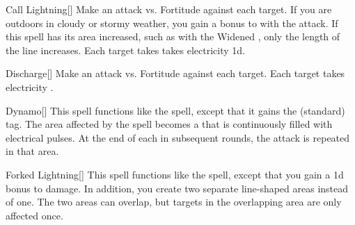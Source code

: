 \lowercase{\hypertarget{spell:Call Lightning}{}}\label{spell:Call Lightning}
\begin{freeability}[\nth{2}]{\hypertarget{spell:Call Lightning}{Call Lightning}}[]
Make an attack vs. Fortitude against each target.
If you are outdoors in cloudy or stormy weather, you gain a  bonus to  with the attack.
If this spell has its area increased, such as with the Widened , only the length of the line increases.
\hit Each target takes takes electricity  \plus1d.
\end{freeability}
\vspace{0.25em}



\lowercase{\hypertarget{spell:Discharge}{}}\label{spell:Discharge}
\begin{freeability}[\nth{2}]{\hypertarget{spell:Discharge}{Discharge}}[]
Make an attack vs. Fortitude against each target.
\hit Each target takes electricity .
\end{freeability}
\vspace{0.25em}



\lowercase{\hypertarget{spell:Dynamo}{}}\label{spell:Dynamo}
\begin{freeability}[\nth{2}]{\hypertarget{spell:Dynamo}{Dynamo}}[]
This spell functions like the  spell, except that it gains the  (standard) tag.
The area affected by the spell becomes a  that is continuously filled with electrical pulses.
At the end of each  in subsequent rounds, the attack is repeated in that area.
\end{freeability}
\vspace{0.25em}



\lowercase{\hypertarget{spell:Forked Lightning}{}}\label{spell:Forked Lightning}
\begin{freeability}[\nth{3}]{\hypertarget{spell:Forked Lightning}{Forked Lightning}}[]
This spell functions like the  spell, except that you gain a \plus1d bonus to damage.
In addition, you create two separate line-shaped areas instead of one.
The two areas can overlap, but targets in the overlapping area are only affected once.
\end{freeability}
\vspace{0.25em}



